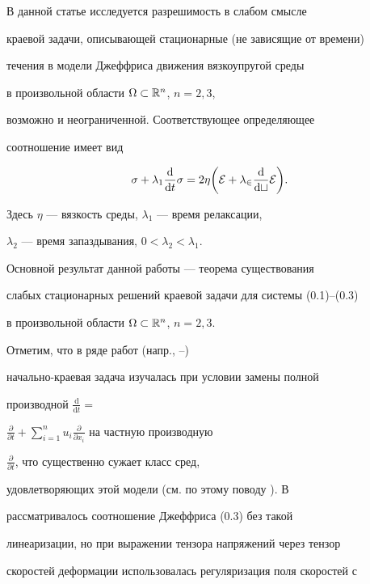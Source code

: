 В данной статье исследуется разрешимость в слабом смысле


краевой задачи, описывающей стационарные (не зависящие от времени)


течения в модели Джеффриса \cite{rei} движения вязкоупругой среды


в произвольной области $\Omega\subset \Bbb{R}^n$, $n=2, 3$,


возможно и неограниченной. Соответствующее определяющее


соотношение имеет вид


\begin{equation}


\sigma + \lambda_1 \frac{\mathrm{d}}{\mathrm{d}t}{\sigma} =


2\eta\bigg(\cal{E}+\lambda_2\frac{\mathrm{d}}{\mathrm{d}t}{\cal{E}}\bigg).


\end{equation}


Здесь $\eta$ --- вязкость среды, $\lambda_1$ --- время релаксации,


$\lambda_2$ --- время запаздывания, $0<\lambda_2<\lambda_1$.





Основной результат данной работы --- теорема существования


слабых стационарных решений краевой задачи для системы (0.1)--(0.3)


в произвольной области $\Omega\subset \Bbb{R}^n$, $n=2, 3$.





Отметим, что в ряде работ (напр., \cite{ags}--\cite{dmz})


начально-краевая задача изучалась при условии замены полной


производной $\frac{\mathrm{d}}{\mathrm{d}t}=$


$\frac{\partial}{\partial t}+\sum\limits_{i=1}^{n}


u_i\frac{\partial}{\partial x_i}$ на частную производную


$\frac{\partial}{\partial t}$, что существенно сужает класс сред,


удовлетворяющих этой модели (см. по этому поводу \cite{old2}). В


\cite{zvd} рассматривалось соотношение Джеффриса (0.3) без такой


линеаризации, но при выражении тензора напряжений через тензор


скоростей деформации использовалась регуляризация поля скоростей с


